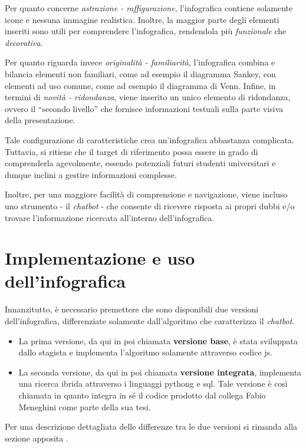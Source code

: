 Per quanto concerne \emph{astrazione - raffigurazione}, l'infografica contiene solamente icone e nessuna immagine realistica. Inoltre, la maggior parte degli elementi
inseriti sono utili per comprendere l'infografica, rendendola più \emph{funzionale} che \emph{decorativa}.

Per quanto riguarda invece \emph{originalità - familiarità}, l'infografica combina e bilancia elementi non familiari, come ad esempio il diagramma Sankey, con elementi
ad uso comune, come ad esempio il diagramma di Venn. 
Infine, in termini di \emph{novità - ridondanza}, viene inserito un unico elemento di ridondanza, ovvero il ``secondo livello'' che fornisce informazioni testuali sulla parte visiva 
della presentazione.

\bigskip
\noindent Tale configurazione di caratteristiche crea un'infografica abbastanza complicata. Tuttavia, si ritiene che il target di riferimento possa essere in grado di comprenderla agevolmente, essendo 
potenziali futuri studenti universitari e dunque inclini a gestire informazioni complesse. 

Inoltre, per una maggiore facilità di comprensione e navigazione, viene incluso uno strumento - il \emph{chatbot} - che consente di ricevere risposta ai propri dubbi e/o 
trovare l'informazione ricercata all'interno dell'infografica.

\section{Implementazione e uso dell'infografica}
Innanzitutto, è necessario premettere che sono disponibili due versioni dell'infografica, differenziate solamente dall'algoritmo che caratterizza il \emph{chatbot}.
\begin{itemize}
    \item La prima versione, da qui in poi chiamata \textbf{versione base}, è stata sviluppata dallo stagista e implementa l'algoritmo solamente attraverso codice \gls{js}. 
    \item La seconda versione, da qui in poi chiamata \textbf{versione integrata}, implementa una ricerca ibrida attraverso i linguaggi \gls{pythong} e \gls{sql}.
    Tale versione è così chiamata in quanto integra in sé il codice prodotto dal collega Fabio Meneghini come parte della sua tesi.    
\end{itemize}
Per una descrizione dettagliata delle differenze tra le due versioni si rimanda alla sezione apposita .

